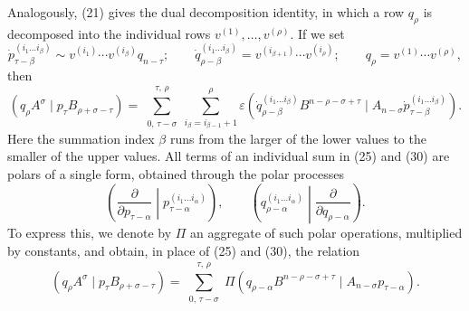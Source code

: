 \documentclass[10pt]{article}
\newcommand{\pair}[2]{(#1\mid #2)}
\newcommand{\eps}{\varepsilon}
\begin{document}
Analogously, (21) gives the dual decomposition identity, in which a row $q_\rho$ is decomposed into the individual rows $v^{(1)},\ldots,v^{(\rho)}$. If we set
\begin{equation}
 \dot p_{\tau-\beta}^{(i_1\ldots i_\beta)}\sim v^{(i_1)}\cdots v^{(i_\beta)}q_{n-\tau};\qquad
 \dot q_{\rho-\beta}^{(i_1\ldots i_\beta)}=v^{(i_{\beta+1})}\cdots v^{(i_\rho)};\qquad
 q_\rho=v^{(1)}\cdots v^{(\rho)},
\tag{29}
\end{equation}
then
\begin{equation}
 \pair{q_\rho A^\sigma}{p_\tau B_{\rho+\sigma-\tau}}
 =\sum_{\substack{0,\,\tau-\sigma}}^{\substack{\tau,\,\rho}}
   \sum_{i_\beta=i_{\beta-1}+1}^{\rho}\eps
 \pair{\dot q_{\rho-\beta}^{(i_1\ldots i_\beta)}B^{n-\rho-\sigma+\tau}}{A_{n-\sigma}\dot p_{\tau-\beta}^{(i_1\ldots i_\beta)}}.
\tag{30}
\end{equation}
Here the summation index $\beta$ runs from the larger of the lower values to the smaller of the upper values. All terms of an individual sum in (25) and (30) are polars of a single form, obtained through the polar processes
\[
\left(\frac{\partial}{\partial p_{\tau-\alpha}}\middle|p_{\tau-\alpha}^{(i_1\ldots i_\alpha)}\right),\qquad
\left(q_{\rho-\alpha}^{(i_1\ldots i_\alpha)}\middle|\frac{\partial}{\partial q_{\rho-\alpha}}\right).
\]
To express this, we denote by $\Pi$ an aggregate of such polar operations, multiplied by constants, and obtain, in place of (25) and (30), the relation
\begin{equation}
 \pair{q_\rho A^\sigma}{p_\tau B_{\rho+\sigma-\tau}}
 =\sum_{\substack{0,\,\tau-\sigma}}^{\substack{\tau,\,\rho}}
 \Pi\pair{q_{\rho-\alpha}B^{n-\rho-\sigma+\tau}}{A_{n-\sigma}p_{\tau-\alpha}}.
\tag{31}
\end{equation}
\end{document}
